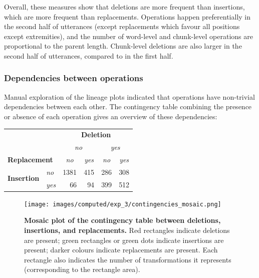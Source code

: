 Overall, these measures show that deletions are more frequent than
insertions, which are more frequent than replacements. Operations happen
preferentially in the second half of utterances (except replacements
which favour all positions except extremities), and the number of
word-level and chunk-level operations are proportional to the parent
length. Chunk-level deletions are also larger in the second half of
utterances, compared to in the first half.

\subsubsection{Dependencies between
operations}\label{dependencies-between-operations}

Manual exploration of the lineage plots indicated that operations have
non-trivial dependencies between each other. The contingency table
combining the presence or absence of each operation gives an overview of
these dependencies:

\begin{center}
  \begin{tabular}{llrrrr}
    \toprule
     & & \multicolumn{4}{c}{\textbf{Deletion}} \\
    \cmidrule(l){3-6}
     & & \multicolumn{2}{c}{\emph{no}} & \multicolumn{2}{c}{\emph{yes}} \\
    \cmidrule(lr){3-4} \cmidrule(l){5-6}
    \multicolumn{2}{l}{\textbf{Replacement}} & \multicolumn{1}{c}{\emph{no}} & \multicolumn{1}{c}{\emph{yes}} & \multicolumn{1}{c}{\emph{no}} & \multicolumn{1}{c}{\emph{yes}} \\
    \midrule
    \multirow{2}{*}{\textbf{Insertion}} & \emph{no} & 1381 & 415 & 286 & 308 \\
     & \emph{yes} & 66 & 94 & 399 & 512 \\
    \bottomrule
  \end{tabular}
\end{center}

\begin{figure}[!ht]
  \centering
  \texttt{[image: images/computed/exp\_3/contingencies\_mosaic.png]}
  \caption[Mosaic plot of the contingency table between deletions, insertions, and replacements]{
  \textbf{Mosaic plot of the contingency table between deletions, insertions, and replacements.}
  Red rectangles indicate deletions are present;
  green rectangles or green dots indicate insertions are present;
  darker colours indicate replacements are present.
  Each rectangle also indicates the number of transformations it represents (corresponding to the rectangle area).
  }
  \label{fig:gistr-contingencies}
\end{figure}

